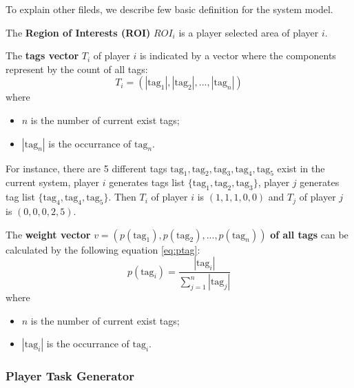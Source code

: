   To explain other fileds, we describe few basic definition for the system model.

  \begin{definition}
  \label{def:roi}
  The \textbf{Region of Interests (ROI)} $ROI_i$ is a player selected area of player $i$.
  \end{definition}

  \begin{definition}
  \label{def:tagv}
  The \textbf{tags vector} $T_i$ of player $i$ is indicated by a vector where the components represent by the count of all tags:
  \[
    T_i = (|\text{tag}_1|, |\text{tag}_2|, ..., |\text{tag}_n|)
  \]
  where 
  \begin{itemize}
  \item $n$ is the number of current exist tags;
  \item $|\text{tag}_n|$ is the occurrance of $\text{tag}_n$.
  \end{itemize}
  \end{definition}
  For instance, there are 5 different tags $\text{tag}_1, \text{tag}_2, \text{tag}_3, \text{tag}_4, \text{tag}_5$ exist in the current system,
  player $i$ generates tags list $\{\text{tag}_1, \text{tag}_2, \text{tag}_3\}$, player $j$ generates tag list
  $\{\text{tag}_4, \text{tag}_4, \text{tag}_5\}$. Then $T_i$ of player $i$ is $(1, 1, 1, 0, 0)$ and $T_j$ of player $j$ is $(0, 0, 0, 2, 5)$.

  \begin{definition}
  \label{def:weightv}
  The \textbf{weight vector} $v = (p(\text{tag}_1), p(\text{tag}_2), ..., p(\text{tag}_n))$ \textbf{of all tags} 
  can be calculated by the following equation \ref{eq:ptag}:
  \begin{equation}
  \label{eq:ptag}
  p(\text{tag}_i) = \frac{|\text{tag}_i|}{\sum_{j=1}^{n}{|\text{tag}_j|}}
  \end{equation}
  where
  \begin{itemize}
  \item $n$ is the number of current exist tags;
  \item $|\text{tag}_i|$ is the occurrance of $\text{tag}_i$.
  \end{itemize}
  \end{definition}

\subsubsection{Player Task Generator}

